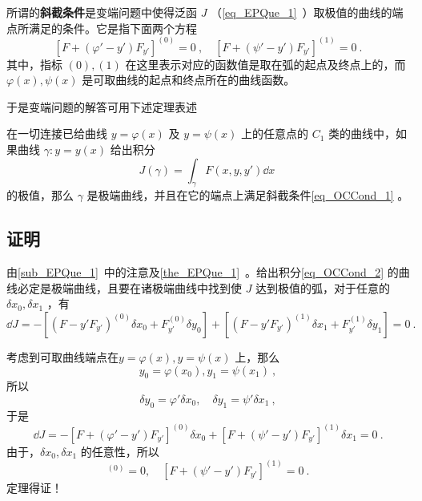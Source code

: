 
所谓的\textbf{斜截条件}是变端问题中使得泛函 $J$ （\autoref{eq_EPQue_1}~）取极值的曲线的端点所满足的条件。它是指下面两个方程
\begin{equation}\label{eq_OCCond_1}
[F+(\varphi'-y')F_{y'}]^{(0)}=0~,\quad [F+(\psi'-y')F_{y'}]^{(1)}=0~.
\end{equation}
其中，指标 ${(0)},{(1)}$ 在这里表示对应的函数值是取在弧的起点及终点上的，而 $\varphi(x),\psi(x)$ 是可取曲线的起点和终点所在的曲线函数。

于是变端问题的解答可用下述定理表述
\begin{theorem}{}
在一切连接已给曲线 $y=\varphi(x)$ 及 $y=\psi(x)$ 上的任意点的 $C_1$ 类的曲线中，如果曲线 $\gamma:y=y(x)$ 给出积分
\begin{equation}\label{eq_OCCond_2}
J(\gamma)=\int_{\gamma}F(x,y,y')\dd x~
\end{equation}
的极值，那么 $\gamma$ 是极端曲线，并且在它的端点上满足斜截条件\autoref{eq_OCCond_1} 。
\end{theorem}
\subsection{证明}
由\autoref{sub_EPQue_1}~中的注意及\autoref{the_EPQue_1}~。给出积分\autoref{eq_OCCond_2} 的曲线必定是极端曲线，且要在诸极端曲线中找到使 $J$ 达到极值的弧，对于任意的 $\delta x_0,\delta x_1$ ，有
\begin{equation}
\dd J=-[(F-y'F_{y'})^{(0)}\delta {x_0}+ F_{y'}^{(0)}\delta y_0]+[(F-y'F_{y'})^{(1)}\delta {x_1}+F_{y'}^{(1)}\delta y_1]=0~.
\end{equation}

 考虑到可取曲线端点在$y=\varphi(x),y=\psi(x)$ 上，那么
 \begin{equation}
 y_0=\varphi(x_0),y_1=\psi(x_1)~,
 \end{equation}
 所以 
 \begin{equation}
 \delta y_0=\varphi'\delta x_0,\quad \delta y_1=\psi'\delta x_1~,
 \end{equation}
 于是
 \begin{equation}
\dd J=-[F+(\varphi'-y')F_{y'}]^{(0)}\delta {x_0}+[F+(\psi'-y')F_{y'}]^{(1)}\delta {x_1}=0~.
\end{equation}
由于，$\delta x_0,\delta x_1$ 的任意性，所以
\begin{equation}
[F+(\varphi'-y')F_{y'}]^{(0)}=0,\quad [F+(\psi'-y')F_{y'}]^{(1)}=0~.
\end{equation}
定理得证！
